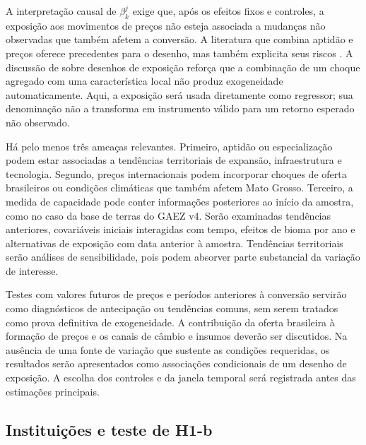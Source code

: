 A interpretação causal de $\beta_k^{j}$ exige que, após os efeitos fixos e controles, a exposição aos movimentos de preços não esteja associada a mudanças não observadas que também afetem a conversão. A literatura que combina aptidão e preços oferece precedentes para o desenho, mas também explicita seus riscos \cite{BermanEtAl2023}. A discussão de  sobre desenhos de exposição reforça que a combinação de um choque agregado com uma característica local não produz exogeneidade automaticamente. Aqui, a exposição será usada diretamente como regressor; sua denominação não a transforma em instrumento válido para um retorno esperado não observado.

Há pelo menos três ameaças relevantes. Primeiro, aptidão ou especialização podem estar associadas a tendências territoriais de expansão, infraestrutura e tecnologia. Segundo, preços internacionais podem incorporar choques de oferta brasileiros ou condições climáticas que também afetem Mato Grosso. Terceiro, a medida de capacidade pode conter informações posteriores ao início da amostra, como no caso da base de terras do GAEZ v4. Serão examinadas tendências anteriores, covariáveis iniciais interagidas com tempo, efeitos de bioma por ano e alternativas de exposição com data anterior à amostra. Tendências territoriais serão análises de sensibilidade, pois podem absorver parte substancial da variação de interesse.

Testes com valores futuros de preços e períodos anteriores à conversão servirão como diagnósticos de antecipação ou tendências comuns, sem serem tratados como prova definitiva de exogeneidade. A contribuição da oferta brasileira à formação de preços e os canais de câmbio e insumos deverão ser discutidos. Na ausência de uma fonte de variação que sustente as condições requeridas, os resultados serão apresentados como associações condicionais de um desenho de exposição. A escolha dos controles e da janela temporal será registrada antes das estimações principais.

\subsection{Instituições e teste de H1-b}

